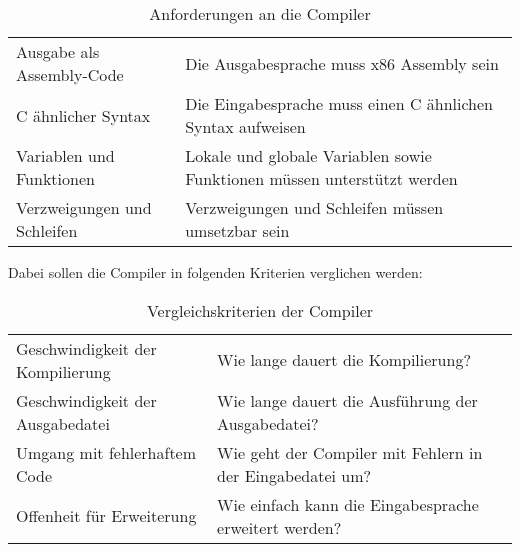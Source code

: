 \begin{table}[H]
    \centering
    \caption{Anforderungen an die Compiler}
    \label{tab:requirements}
    \vspace{3mm} %
    
    \begin{tabular}{l|l}
    Ausgabe als Assembly-Code       & Die Ausgabesprache muss x86 Assembly sein                                \\
    C ähnlicher Syntax              & Die Eingabesprache muss einen C ähnlichen Syntax aufweisen               \\
    Variablen und Funktionen        & Lokale und globale Variablen sowie Funktionen müssen unterstützt werden  \\
    Verzweigungen und Schleifen     & Verzweigungen und Schleifen müssen umsetzbar sein
    \end{tabular}
\end{table}

Dabei sollen die Compiler in folgenden Kriterien verglichen werden:

\begin{table}[H]
    \centering
    \caption{Vergleichskriterien der Compiler}
    \label{tab:criteria}
    \vspace{3mm} %

    \begin{tabular}{l|l}
    Geschwindigkeit der Kompilierung    & Wie lange dauert die Kompilierung?                                \\
    Geschwindigkeit der Ausgabedatei    & Wie lange dauert die Ausführung der Ausgabedatei?                 \\
    Umgang mit fehlerhaftem Code        & Wie geht der Compiler mit Fehlern in der Eingabedatei um?         \\
    Offenheit für Erweiterung           & Wie einfach kann die Eingabesprache erweitert werden?                                 
    \end{tabular}
\end{table}

